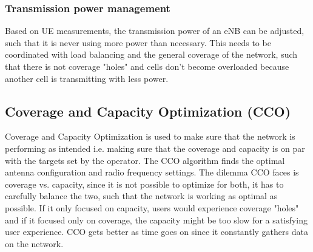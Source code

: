 \documentclass{report}
\begin{document}
\subsubsection{Transmission power management}
Based on UE measurements, the transmission power of an eNB can be adjusted, such that it is never using more power than necessary. This needs to be coordinated with load balancing and the general coverage of the network, such that there is not coverage "holes" and cells don't become overloaded because another cell is transmitting with less power. \cite{Feng2008}

\subsection{Coverage and Capacity Optimization (CCO)}
Coverage and Capacity Optimization is used to make sure that the network is performing as intended i.e. making sure that the coverage and capacity is on par with the targets set by the operator. The CCO algorithm finds the optimal antenna configuration and radio frequency settings.
The dilemma CCO faces is coverage vs. capacity, since it is not possible to optimize for both, it has to carefully balance the two, such that the network is working as optimal as possible. If it only focused on capacity, users would experience coverage "holes" and if it focused only on coverage, the capacity might be too slow for a satisfying user experience. 
CCO gets better as time goes on since it constantly gathers data on the network. 
\end{document}
